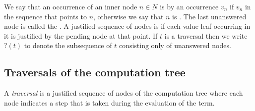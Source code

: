 We say that an occurrence of an inner node $n \in N$ is
 by an occurrence $v_n$ if $v_n$ in
the sequence that points to $n$, otherwise we say that $n$ is
. The last unanswered node is called the
.  A justified sequence of nodes is
 if each value-leaf occurring in it is justified by the pending node at that point.  If $t$ is a traversal then we write
$?(t)$ to denote the subsequence of $t$ consisting only of
unanswered nodes.

\subsection{Traversals of the computation tree}
\label{subsec:traversal}

A \emph{traversal} is a justified sequence of nodes of the computation tree where each node
indicates a step that is taken during the evaluation of the term.

